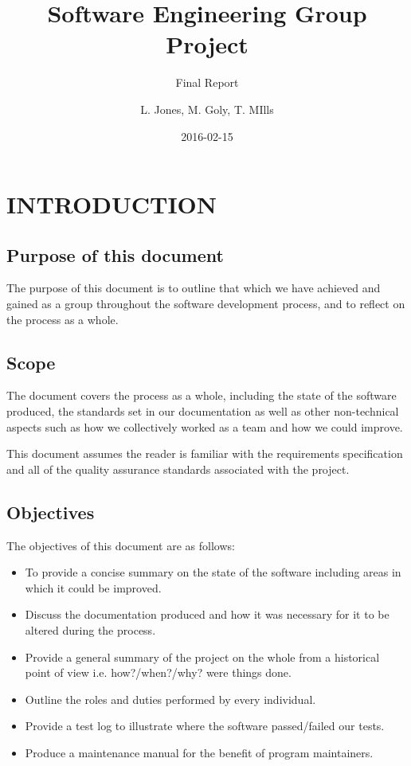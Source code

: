 \documentclass{project}
\begin{document}
\title{Software Engineering Group Project}
\subtitle{Final Report}
\author{L. Jones, M. Goly, T. MIlls}     
\date{2016-02-15}
\maketitle
\tableofcontents 
\newpage

\section{INTRODUCTION}
\subsection{Purpose of this document}
The purpose of this document is to outline that which we have achieved and gained as a group throughout the software development process, and to reflect on the process as a whole.

\subsection{Scope}
The document covers the process as a whole, including the state of the software produced, the standards set in our documentation as well as other non-technical aspects such as how we collectively worked as a team and how we could improve.

This document assumes the reader is familiar with the requirements specification\cite{se.qa.rs} and all of the quality assurance standards associated with the project.

\subsection{Objectives}
The objectives of this document are as follows:
\begin{itemize}
\item{To provide a concise summary on the state of the software including areas in which it could be improved.}
\item{Discuss the documentation produced and how it was necessary for it to be altered during the process.}
\item{Provide a general summary of the project on the whole from a historical point of view i.e. how?/when?/why? were things done.}
\item{Outline the roles and duties performed by every individual.}
\item{Provide a test log to illustrate where the software passed/failed our tests\cite{se.qa.ts}.}
\item{Produce a maintenance manual for the benefit of program maintainers.}
\end{itemize}
\clearpage
\end{document}
